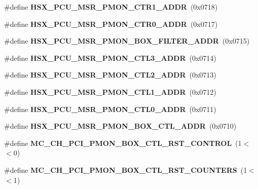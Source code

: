 \begin{DoxyCompactItemize}
\item 
\#define {\bfseries H\+S\+X\+\_\+\+P\+C\+U\+\_\+\+M\+S\+R\+\_\+\+P\+M\+O\+N\+\_\+\+C\+T\+R1\+\_\+\+A\+D\+DR}~(0x0718)\label{types_8h_af364a115d3c96668cd4f7cc49de536c0}

\item 
\#define {\bfseries H\+S\+X\+\_\+\+P\+C\+U\+\_\+\+M\+S\+R\+\_\+\+P\+M\+O\+N\+\_\+\+C\+T\+R0\+\_\+\+A\+D\+DR}~(0x0717)\label{types_8h_a9c523fc1e96d8d3f84af7139e1aea411}

\item 
\#define {\bfseries H\+S\+X\+\_\+\+P\+C\+U\+\_\+\+M\+S\+R\+\_\+\+P\+M\+O\+N\+\_\+\+B\+O\+X\+\_\+\+F\+I\+L\+T\+E\+R\+\_\+\+A\+D\+DR}~(0x0715)\label{types_8h_a4df4be5e87246efb1c7c5efc60c3d54b}

\item 
\#define {\bfseries H\+S\+X\+\_\+\+P\+C\+U\+\_\+\+M\+S\+R\+\_\+\+P\+M\+O\+N\+\_\+\+C\+T\+L3\+\_\+\+A\+D\+DR}~(0x0714)\label{types_8h_ab6a84afc8059ff3fbdd3e31c4c5c7eab}

\item 
\#define {\bfseries H\+S\+X\+\_\+\+P\+C\+U\+\_\+\+M\+S\+R\+\_\+\+P\+M\+O\+N\+\_\+\+C\+T\+L2\+\_\+\+A\+D\+DR}~(0x0713)\label{types_8h_aff25e26c9829b71d5e152803b05d5b87}

\item 
\#define {\bfseries H\+S\+X\+\_\+\+P\+C\+U\+\_\+\+M\+S\+R\+\_\+\+P\+M\+O\+N\+\_\+\+C\+T\+L1\+\_\+\+A\+D\+DR}~(0x0712)\label{types_8h_ae4771b69f2b2f8768dfb6864f8f01938}

\item 
\#define {\bfseries H\+S\+X\+\_\+\+P\+C\+U\+\_\+\+M\+S\+R\+\_\+\+P\+M\+O\+N\+\_\+\+C\+T\+L0\+\_\+\+A\+D\+DR}~(0x0711)\label{types_8h_ae2ba1df84934237c90c8960b9b8087c8}

\item 
\#define {\bfseries H\+S\+X\+\_\+\+P\+C\+U\+\_\+\+M\+S\+R\+\_\+\+P\+M\+O\+N\+\_\+\+B\+O\+X\+\_\+\+C\+T\+L\+\_\+\+A\+D\+DR}~(0x0710)\label{types_8h_a9c0e92fd4e80ecf71b5872a577e7cab3}

\item 
\#define {\bfseries M\+C\+\_\+\+C\+H\+\_\+\+P\+C\+I\+\_\+\+P\+M\+O\+N\+\_\+\+B\+O\+X\+\_\+\+C\+T\+L\+\_\+\+R\+S\+T\+\_\+\+C\+O\+N\+T\+R\+OL}~(1$<$$<$0)\label{types_8h_a65cac0a218f19cd43f965cee10f8f9b7}

\item 
\#define {\bfseries M\+C\+\_\+\+C\+H\+\_\+\+P\+C\+I\+\_\+\+P\+M\+O\+N\+\_\+\+B\+O\+X\+\_\+\+C\+T\+L\+\_\+\+R\+S\+T\+\_\+\+C\+O\+U\+N\+T\+E\+RS}~(1$<$$<$1)\label{types_8h_abe2e9ee35901cb368d216c1930395fe2}


\end{DoxyCompactItemize}
